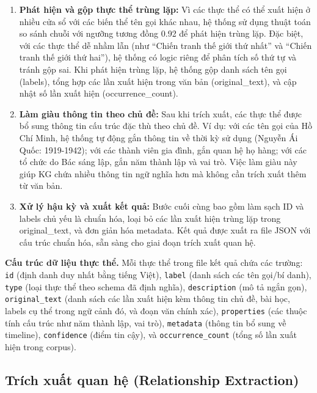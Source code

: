 \begin{enumerate}
    \item \textbf{Phát hiện và gộp thực thể trùng lặp:} Vì các thực thể có thể xuất hiện ở nhiều cửa sổ với các biến thể tên gọi khác nhau, hệ thống sử dụng thuật toán so sánh chuỗi với ngưỡng tương đồng 0.92 để phát hiện trùng lặp. Đặc biệt, với các thực thể dễ nhầm lẫn (như ``Chiến tranh thế giới thứ nhất'' và ``Chiến tranh thế giới thứ hai''), hệ thống có logic riêng để phân tích số thứ tự và tránh gộp sai. Khi phát hiện trùng lặp, hệ thống gộp danh sách tên gọi (labels), tổng hợp các lần xuất hiện trong văn bản (original\_text), và cập nhật số lần xuất hiện (occurrence\_count).

    \item \textbf{Làm giàu thông tin theo chủ đề:} Sau khi trích xuất, các thực thể được bổ sung thông tin cấu trúc đặc thù theo chủ đề. Ví dụ: với các tên gọi của Hồ Chí Minh, hệ thống tự động gắn thông tin về thời kỳ sử dụng (Nguyễn Ái Quốc: 1919-1942); với các thành viên gia đình, gắn quan hệ họ hàng; với các tổ chức do Bác sáng lập, gắn năm thành lập và vai trò. Việc làm giàu này giúp KG chứa nhiều thông tin ngữ nghĩa hơn mà không cần trích xuất thêm từ văn bản.

    \item \textbf{Xử lý hậu kỳ và xuất kết quả:} Bước cuối cùng bao gồm làm sạch ID và labels chủ yếu là chuẩn hóa, loại bỏ các lần xuất hiện trùng lặp trong original\_text, và đơn giản hóa metadata. Kết quả được xuất ra file JSON với cấu trúc chuẩn hóa, sẵn sàng cho giai đoạn trích xuất quan hệ.
\end{enumerate}

\vspace{0.5em}
\noindent\textbf{Cấu trúc dữ liệu thực thể.}
Mỗi thực thể trong file kết quả chứa các trường: 
\texttt{id} (định danh duy nhất bằng tiếng Việt), 
\texttt{label} (danh sách các tên gọi/bí danh), 
\texttt{type} (loại thực thể theo schema đã định nghĩa), 
\texttt{description} (mô tả ngắn gọn), 
\texttt{original\_text} (danh sách các lần xuất hiện kèm thông tin chủ đề, bài học, labels cụ thể trong ngữ cảnh đó, và đoạn văn chính xác), 
\texttt{properties} (các thuộc tính cấu trúc như năm thành lập, vai trò), \texttt{metadata} (thông tin bổ sung về timeline), 
\texttt{confidence} (điểm tin cậy), và 
\texttt{occurrence\_count} (tổng số lần xuất hiện trong corpus).


\subsection{Trích xuất quan hệ (Relationship Extraction)}
\label{subsec:relationship_extraction}

